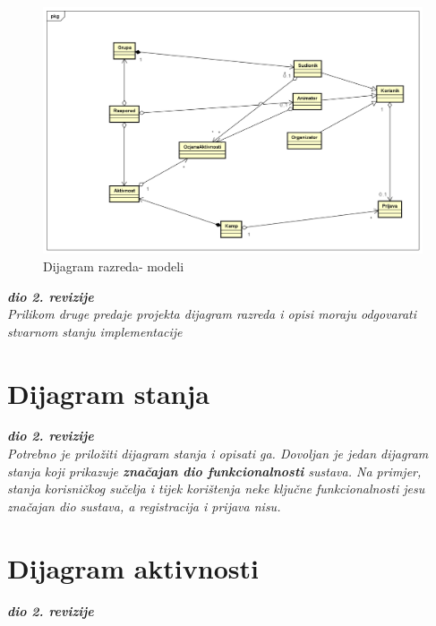 			\begin{figure}[H]
				\centerline{\includegraphics[width=\linewidth]{slike/Dijagram_razreda_modeli.png}}
				\caption{Dijagram razreda- modeli}
				\label{fig:dijagram_razreda_modeli}
			\end{figure}
			
			\eject
			
			\textbf{\textit{dio 2. revizije}}\\			
			
			\textit{Prilikom druge predaje projekta dijagram razreda i opisi moraju odgovarati stvarnom stanju implementacije}
			
			
			
			\eject
		
		\section{Dijagram stanja}
			
			
			\textbf{\textit{dio 2. revizije}}\\
			
			\textit{Potrebno je priložiti dijagram stanja i opisati ga. Dovoljan je jedan dijagram stanja koji prikazuje \textbf{značajan dio funkcionalnosti} sustava. Na primjer, stanja korisničkog sučelja i tijek korištenja neke ključne funkcionalnosti jesu značajan dio sustava, a registracija i prijava nisu. }
			
			
			\eject 
		
		\section{Dijagram aktivnosti}
			
			\textbf{\textit{dio 2. revizije}}\\
			
